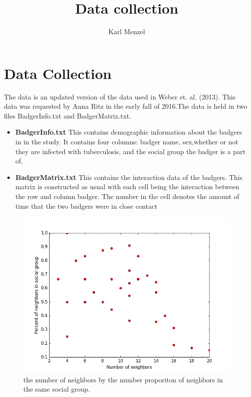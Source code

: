 \documentclass[11pt]{article}
\title{Data collection}
\author{Karl Menzel}
\begin{document}
\maketitle

\section{Data Collection}
The data is an updated version of the data used in Weber et. al. (2013). This data was requested by Anna Ritz in the early fall of 2016.The data is held in two files BadgerInfo.txt and BadgerMatrix.txt.
\begin{itemize}
\item \textbf{BadgerInfo.txt}  This contains demographic information about the badgers in in the study.  It contains four columns: badger name, sex,whether or not they are infected with tuberculosis, and the social group the badger is a part of.

\item  \textbf{BadgerMatrix.txt}  This contains the interaction data of the badgers. This matrix is constructed as usual with each cell being the interaction between the row and column badger.  The number in the cell denotes the amount of time that the two badgers were in close contact
\end{itemize}

\begin{figure}
\includegraphics[width=\linewidth]{proportionInOut.png}
\caption{the number of neighbors by the number proporiton of neighbors in the same social group.} %
\label{figure} %
\end{figure} 
 
\end{document}
